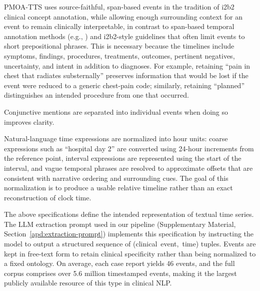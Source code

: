 \documentclass[pdflatex,sn-mathphys-num]{sn-jnl}%
\newif\ifshowrebuttalcolor
\newcommand{\rebuttal}[1]{%
  \ifshowrebuttalcolor
    \textcolor{rebuttalblue}{#1}%
  \else
    #1%
  \fi
}
\theoremstyle{thmstyleone}%
\theoremstyle{thmstyletwo}%
\theoremstyle{thmstylethree}%
\begin{document}

\rebuttal{
PMOA-TTS uses source-faithful, span-based events in the tradition of i2b2 clinical concept annotation, while allowing enough surrounding context for an event to remain clinically interpretable, in contrast to span-based temporal annotation methods (e.g., \cite{sun2013evaluating, uzuner20112010}) and i2b2-style guidelines that often limit events to short prepositional phrases. This is necessary because the timelines include symptoms, findings, procedures, treatments, outcomes, pertinent negatives, uncertainty, and intent in addition to diagnoses. For example, retaining ``pain in chest that radiates substernally'' preserves information that would be lost if the event were reduced to a generic chest-pain code; similarly, retaining ``planned'' distinguishes an intended procedure from one that occurred.
}
Conjunctive mentions are separated into individual events when doing so improves clarity.

Natural-language time expressions are normalized into hour units: coarse expressions such as “hospital day 2” are converted using 24-hour increments from the reference point, interval expressions are represented using the start of the interval, and vague temporal phrases are resolved to approximate offsets that are consistent with narrative ordering and surrounding cues. The goal of this normalization is to produce a usable relative timeline rather than an exact reconstruction of clock time.

The above specifications define the intended representation of textual time series. The LLM extraction prompt used in our pipeline (Supplementary Material, Section~\ref{apd:extraction-prompt}) implements this specification by instructing the model to output a structured sequence of \mbox{(clinical event, time)} tuples. Events are kept in free-text form to retain clinical specificity rather than being normalized to a fixed ontology. On average, each case report yields 46 events, and the full corpus comprises over 5.6 million timestamped events, making it the largest publicly available resource of this type in clinical NLP.
\end{document}
